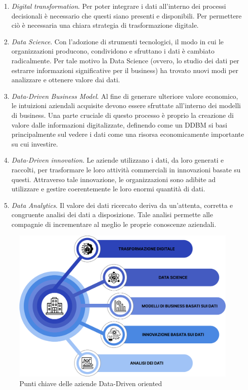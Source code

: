 \begin{enumerate}
    \item \textit{Digital transformation}. Per poter integrare i dati all'interno dei processi decisionali è necessario che questi siano presenti e disponibili. Per permettere ciò è necessaria una chiara strategia di trasformazione digitale.
    \item \textit{Data Science}. Con l'adozione di strumenti tecnologici, il modo in cui le organizzazioni producono, condividono e sfruttano i dati è cambiato radicalmente. Per tale motivo la Data Science (ovvero, lo studio dei dati per estrarre informazioni significative per il business) ha trovato nuovi modi per analizzare e ottenere valore dai dati.
    \item \textit{Data-Driven Business Model}. Al fine di generare ulteriore valore economico, le intuizioni aziendali acquisite devono essere sfruttate all'interno dei modelli di business. Una parte cruciale di questo processo è proprio la creazione di valore dalle informazioni digitalizzate, definendo come un DDBM si basi principalmente sul vedere i dati come una risorsa economicamente importante su cui investire.
    \item \textit{Data-Driven innovation}. Le aziende utilizzano i dati, da loro generati e raccolti, per trasformare le loro attività commerciali in innovazioni basate su questi. Attraverso tale innovazione, le organizzazioni sono adibite ad utilizzare e gestire coerentemente le loro enormi quantità di dati.
    \item \textit{Data Analytics}. Il valore dei dati ricercato deriva da un'attenta, corretta e congruente analisi dei dati a disposizione. Tale analisi permette alle compagnie di incrementare al meglio le proprie conoscenze aziendali.
\end{enumerate}

\begin{figure}[H]
    \centering
    \includegraphics[width=0.75\linewidth]{figure/capitolo_1/Data-Driven company key points.pdf}
    \caption{Punti chiave delle aziende Data-Driven oriented}
    \label{fig:Data-Driven company key points}
\end{figure}

